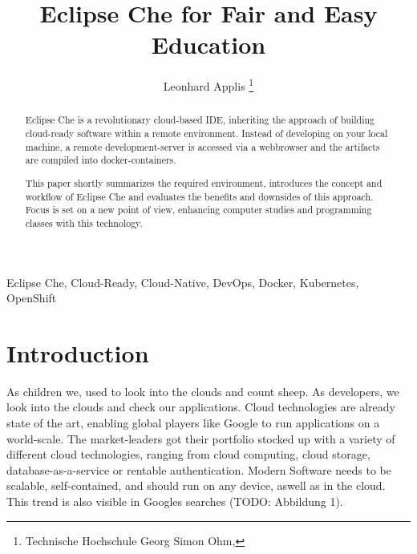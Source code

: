 \documentclass[utf8,biblatex]{lni}
\begin{document}
\title[Eclipse Che for Education]{Eclipse Che for Fair and Easy Education}
\author[Leonhard Applis]
{Leonhard Applis \footnote{Technische Hochschule Georg Simon Ohm, }}
\maketitle

\begin{abstract}
Eclipse Che is a revolutionary cloud-based IDE, inheriting the approach of building cloud-ready software within a 
remote environment. 
Instead of developing on your local machine, a remote development-server is accessed via a webbrowser 
and the artifacts are compiled into docker-containers. 

This paper shortly summarizes the required environment, introduces the concept and workflow of Eclipse Che and evaluates 
the benefits and downsides of this approach. 
Focus is set on a new point of view, enhancing computer studies and 
programming classes with this technology. 
\end{abstract}

\begin{keywords}
Eclipse Che, Cloud-Ready, Cloud-Native, DevOps, Docker, Kubernetes, OpenShift
\end{keywords}

\section{Introduction}
As children we, used to look into the clouds and count sheep. 
As developers, we look into the clouds and check our applications.  
Cloud technologies are already state of the art, enabling global players like Google to run applications on a world-scale.
The market-leaders got their portfolio stocked up with  a  variety  of  different  cloud  technologies,  ranging 
from cloud computing, cloud storage, database-as-a-service or rentable authentication. 
Modern Software needs to be scalable, self-contained, and should run on any device, aswell as in the cloud.  
This trend is also visible in Googles searches (TODO: Abbildung 1). 
\end{document}

